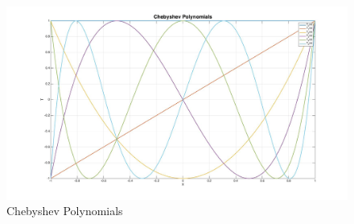 \begin{figure}[ht!]
\includegraphics[keepaspectratio=true,width=6in]{./figures/appendix/cheby.jpg}
\centering
\caption{Chebyshev Polynomials \cite{wolf_cheby}}
\label{fig:cheby}
\end{figure}

